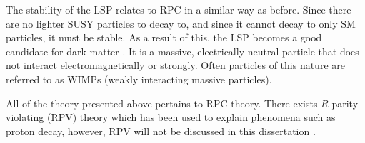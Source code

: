 The stability of the LSP relates to RPC in a similar way as before. 
Since there are no lighter SUSY particles to decay to, and since it cannot decay to only SM particles, it must be stable.
As a result of this, the LSP becomes a good candidate for dark matter \cite{jungman1996supersymmetric}.
It is a massive, electrically neutral particle that does not interact electromagnetically or strongly.
Often particles of this nature are referred to as WIMPs (weakly interacting massive particles).

All of the theory presented above pertains to RPC theory.
There exists $R$-parity violating (RPV) theory which has been used to explain phenomena such as proton decay, however, RPV will not be discussed in this dissertation \cite{barbier2005r}.